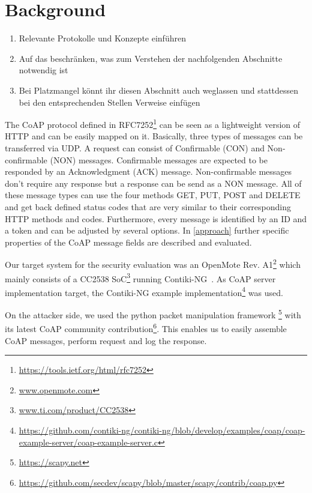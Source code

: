 \section{Background}

\begin{enumerate}
	\item Relevante Protokolle und Konzepte einführen
	\item Auf das beschränken, was zum Verstehen der nachfolgenden Abschnitte notwendig ist
	\item Bei Platzmangel könnt ihr diesen Abschnitt auch weglassen und stattdessen bei den entsprechenden Stellen Verweise einfügen
\end{enumerate}

The CoAP protocol defined in RFC7252\footnote{\url{https://tools.ietf.org/html/rfc7252}} can be seen as a lightweight version of HTTP and can be easily mapped on it. Basically, three types of messages can be transferred via UDP. A request can consist of Confirmable (CON) and Non-confirmable (NON) messages. Confirmable messages are expected to be responded by an Acknowledgment (ACK) message. Non-confirmable messages don't require any response but a response can be send as a NON message. All of these message types can use the four methods GET, PUT, POST and DELETE and get back defined status codes that are very similar to their corresponding HTTP methods and codes. Furthermore, every message is identified by an ID and a token and can be adjusted by several options. In \autoref{approach} further specific properties of the CoAP message fields are described and evaluated.

Our target system for the security evaluation was an OpenMote Rev. A1\footnote{\url{www.openmote.com}} which mainly consists of a CC2538 SoC\footnote{\url{www.ti.com/product/CC2538}} running Contiki-NG~\cite{contiki}. As CoAP server implementation target, the Contiki-NG example implementation\footnote{\url{https://github.com/contiki-ng/contiki-ng/blob/develop/examples/coap/coap-example-server/coap-example-server.c}} was used.

On the attacker side, we used the python packet manipulation framework \scapy\footnote{\url{https://scapy.net}} with its latest CoAP community contribution\footnote{\url{https://github.com/secdev/scapy/blob/master/scapy/contrib/coap.py}}. This enables us to easily assemble CoAP messages, perform request and log the response.

